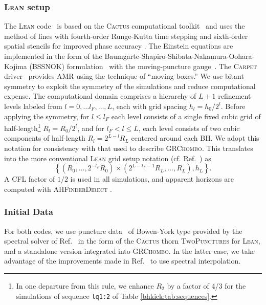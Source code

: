 \subsubsection{\textsc{Lean} setup}
\label{bhkick:sec:lean}
The \textsc{Lean} code~\cite{Sperhake:2006cy} is based on the
\textsc{Cactus} computational toolkit~\cite{Goodale2002a} and uses
the method of lines with fourth-order Runge-Kutta time stepping and
sixth-order spatial stencils for improved phase accuracy
\cite{Husa:2007hp}. The Einstein equations are implemented in the form
of the Baumgarte-Shapiro-Shibata-Nakamura-Oohara-Kojima (BSSNOK)
formulation~\cite{Nakamura:1987zz,Shibata:1995we,Baumgarte:1998te}
with the moving-puncture gauge~\cite{Campanelli:2005dd,Baker:2005vv}.
The \textsc{Carpet} driver~\cite{Schnetter:2003rb} provides AMR using
the technique of ``moving boxes.'' We use bitant symmetry to exploit
the symmetry of the simulations and reduce computational expense.
The computational domain
comprises a hierarchy of $L+1$ refinement levels labeled from
$l=0,\ldots l_F,\ldots,L$, each with grid spacing $h_l=h_0/2^l$.
Before applying the symmetry, for $l\leq l_F$ each level consists of
a single fixed cubic grid of half-length\footnote{In one departure from
this rule, we enhance $R_2$ by a factor of 4/3 for the simulations
of sequence \texttt{lq1:2} of Table \ref{bhkick:tab:sequences}.}
$R_l=R_0/2^l$, and for
$l_F<l\leq L$, each level consists of two cubic components of
half-length $R_l=2^{L-l}R_L$ centered around each BH. We adopt this
notation for consistency with that used to describe \textsc{GRChombo}.
This translates into the more conventional \textsc{Lean} grid setup
notation (cf. Ref.~\cite{Sperhake:2006cy}) as
\begin{equation}
    \left\{(R_0,\ldots,2^{-l_F}R_0) \times
    (2^{L-l_F-1}R_L,\ldots,R_L),h_L\right\}.
\end{equation}
A CFL factor of $1/2$ is used in all simulations, and apparent horizons
are computed with \textsc{AHFinderDirect}
\cite{Thornburg:1995cp,Thornburg:2003sf}.

\subsubsection{Initial Data}
For both codes, we use puncture data~\cite{Brandt:1997tf} of
Bowen-York \cite{Bowen:1980yu} type provided by the spectral solver of
Ref.~\cite{Ansorg:2004ds} in the form of the \textsc{Cactus} thorn
\textsc{TwoPunctures} for \textsc{Lean}, and a standalone version
integrated into \textsc{GRChombo}.  In the latter case, we take
advantage of the improvements made in Ref.~\cite{Paschalidis:2013oya}
to use spectral interpolation.

